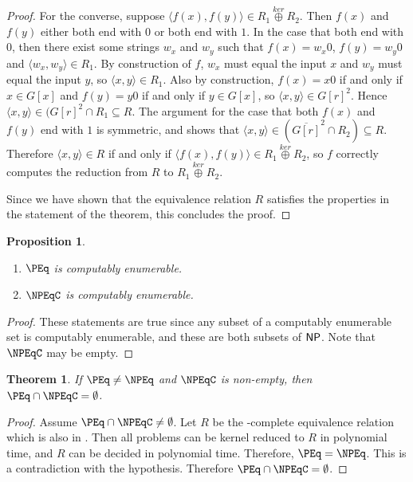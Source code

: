 \documentclass{article}
\newtheorem{theorem}{Theorem}[section]
\newtheorem{proposition}[proposition]{Proposition}
\theoremstyle{definition} \newtheorem{definition}[definition]{Definition}
\newcommand{\kj}{\overset{ker}{\oplus}} %
\newcommand{\pair}[2]{\langle#1,#2\rangle} %
\begin{document}
\begin{proof}
  For the converse, suppose $\pair{f(x)}{f(y)}\in R_1\kj R_2$. Then $f(x)$ and
  $f(y)$ either both end with $0$ or both end with $1$. In the case that both
  end with $0$, then there exist some strings $w_x$ and $w_y$ such that
  $f(x)=w_x0$, $f(y)=w_y0$ and $\pair{w_x}{w_y}\in R_1$. By construction of
  $f$, $w_x$ must equal the input $x$ and $w_y$ must equal the input $y$, so
  $\pair{x}{y}\in R_1$. Also by construction, $f(x)=x0$ if and only if $x\in
  G[x]$ and $f(y)=y0$ if and only if $y\in G[x]$, so
  $\pair{x}{y}\in{G[r]}^2$. Hence $\pair{x}{y}\in({G[r]}^2\cap R_1\subseteq
  R$. The argument for the case that both $f(x)$ and $f(y)$ end with $1$ is
  symmetric, and shows that $\pair{x}{y}\in(\overline{G[r]}^2\cap R_2)\subseteq
  R$. Therefore $\pair{x}{y}\in R$ if and only if $\pair{f(x)}{f(y)}\in R_1\kj
  R_2$, so $f$ correctly computes the reduction from $R$ to $R_1\kj R_2$.

  Since we have shown that the equivalence relation $R$ satisfies the
  properties in the statement of the theorem, this concludes the proof.
\end{proof}

\begin{proposition}
  \mbox{} %
  \begin{enumerate}
  \item $\PEq$ is computably enumerable.
  \item $\NPEqC$ is computably enumerable.
  \end{enumerate}
\end{proposition}
\begin{proof}
  These statements are true since any subset of a computably enumerable set is computably enumerable, and these are both subsets of ${\mathsf{NP}}$.
  Note that $\NPEqC$ may be empty.
\end{proof}

\begin{theorem}\label{thm:npeqc}
  If $\PEq\neq\NPEq$ and $\NPEqC$ is non-empty, then $\PEq\cap\NPEqC=\emptyset$.
\end{theorem}
\begin{proof}
  Assume $\PEq\cap\NPEqC\neq\emptyset$. Let $R$ be the \NPEq-complete
  equivalence relation which is also in \PEq. Then all problems can be kernel
  reduced to $R$ in polynomial time, and $R$ can be decided in polynomial
  time. Therefore, $\PEq=\NPEq$. This is a contradiction with the
  hypothesis. Therefore $\PEq\cap\NPEqC=\emptyset$.
\end{proof}
\end{document}
